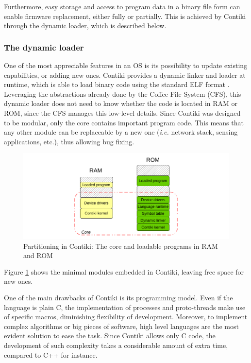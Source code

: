 Furthermore, easy storage and access to program data in a binary file form can enable firmware replacement, either fully or partially.
This is achieved by Contiki through the dynamic loader, which is described below.

\subsubsection{The dynamic loader}
One of the most appreciable features in an OS is its possibility to update existing capabilities, or adding new ones.
Contiki provides a dynamic linker and loader at runtime, which is able to load binary code using the standard ELF format \cite{tis1995tool}.
Leveraging the abstractions already done by the Coffee File System (CFS), this dynamic loader does not need to know whether the code is located in RAM or ROM, since the CFS manages this low-level details.
Since Contiki was designed to be modular, only the core contains important program code.
This means that any other module can be replaceable by a new one (\textit{i.e.} network stack, sensing applications, etc.), thus allowing bug fixing.

\begin{figure}[htb]
	\centering
	\includegraphics[width=1\columnwidth]{chapters/background.images/ContikiPartitioning.pdf}
	\caption{Partitioning in Contiki: The core and loadable programs in RAM and ROM \cite{dunkels06runtime}}
	\label{fig:ContikiModules}
\end{figure}

Figure \ref{fig:ContikiModules} shows the minimal modules embedded in Contiki, leaving free space for new ones.

One of the main drawbacks of Contiki is its programming model.
Even if the language is plain C, the implementation of processes and proto-threads make use of specific macros, diminishing flexibility of development.
Moreover, to implement complex algorithms or big pieces of software, high level languages are the most evident solution to ease the task.
Since Contiki allows only C code, the development of such complexity takes a considerable amount of extra time, compared to C++ for instance.

